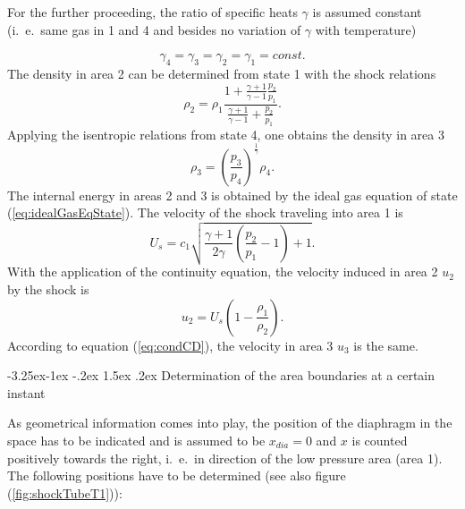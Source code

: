 \documentclass{report}
\makeatletter
\renewcommand\paragraph{\@startsection{paragraph}{4}{\z@}%
  {-3.25ex\@plus -1ex \@minus -.2ex}%
  {1.5ex \@plus .2ex}%
  {\normalfont\normalsize\bfseries}}
\makeatother
\begin{document}
For the further proceeding, the ratio of specific heats $\gamma$ is assumed constant (i.\ e.\ same gas in 1 and 4 and besides no variation of $\gamma$ with temperature)

\begin{equation}
 \gamma_4= \gamma_3= \gamma_2= \gamma_1=const.
\end{equation}
The density in area 2 can be determined from state 1 with the shock relations 
\begin{equation}
 \rho_2=\rho_1\frac{1+\frac{\gamma+1}{\gamma-1}\frac{p_2}{p_1}}{\frac{\gamma+1}{\gamma-1}+\frac{p_2}{p_1}}.
\end{equation}
Applying the isentropic relations from state 4, one obtains the density in area 3
\begin{equation}
\rho_3=\left(\frac{p_3}{p_4}\right)^{\frac{1}{\gamma}}\rho_4.
\end{equation}
The internal energy in areas 2 and 3 is obtained by the ideal gas equation of state (\ref{eq:idealGasEqState}).
The velocity of the shock traveling into area 1 is
\begin{equation}
\label{eq:shockVelocity}
U_s=c_1\sqrt{\frac{\gamma+1}{2\gamma}\left(\frac{p_2}{p_1}-1\right)+1}.
\end{equation}
With the application of the continuity equation, the velocity induced in area 2 $u_2$ by the shock is
\begin{equation}
 u_2=U_s\left(1-\frac{\rho_1}{\rho_2}\right).
\end{equation}
According to equation (\ref{eq:condCD}), the velocity in area 3 $u_3$ is the same.

\paragraph{Determination of the area boundaries at a certain instant}

As geometrical information comes into play, the position of the diaphragm in the space has to be indicated and is assumed to be $x_{dia}=0$ and $x$ is counted positively towards the right, i.\ e.\ in direction of the low pressure area (area 1).
The following positions have to be determined (see also figure (\ref{fig:shockTubeT1})):
\end{document}

